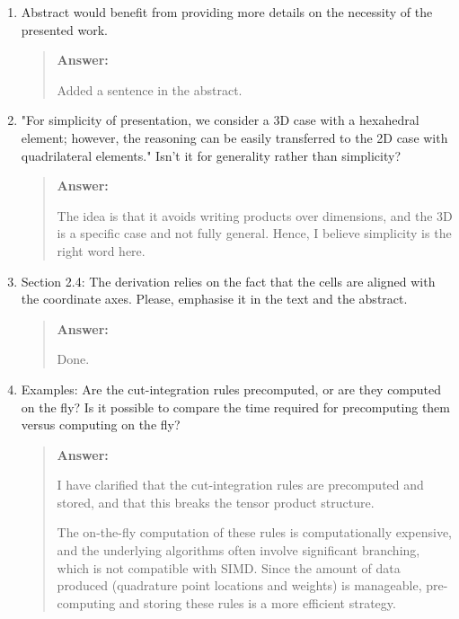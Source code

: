 \documentclass[11pt, a4paper]{article}
\newenvironment{answer}{%
      \begin{quote}%
            \color{blue!80!black}%
            \textbf{Answer:}%
            }{%
      \end{quote}%
}
\begin{document}
\begin{enumerate}[label=\textbullet]
      \item Abstract would benefit from providing more details on the necessity of the presented work.
            \begin{answer}
                  Added a sentence in the abstract.
            \end{answer}

      \item "For simplicity of presentation, we consider a 3D case with a hexahedral element; however, the reasoning
            can be easily transferred to the 2D case with quadrilateral elements." Isn't it for generality rather than
            simplicity?
            \begin{answer}
                  The idea is that it avoids writing products over dimensions, and the 3D is a specific case and not
                  fully general. Hence, I believe simplicity is the right word here.
            \end{answer}

      \item Section 2.4: The derivation relies on the fact that the cells are aligned with the coordinate axes.
            Please, emphasise it in the text and the abstract.
            \begin{answer}
                  Done.
            \end{answer}

      \item Examples: Are the cut-integration rules precomputed, or are they computed on the fly? Is it possible to
            compare the time required for precomputing them versus computing on the fly?
            \begin{answer}
                  I have clarified that the
                  cut-integration rules are precomputed and stored, and that this breaks the tensor product
                  structure.

                  The on-the-fly computation of these rules is computationally expensive, and the underlying algorithms
                  often involve significant branching, which is not compatible with SIMD. Since the amount of data
                  produced (quadrature point locations and weights) is manageable, pre-computing and storing these
                  rules is a more efficient strategy.
            \end{answer}
\end{enumerate}
\end{document}
